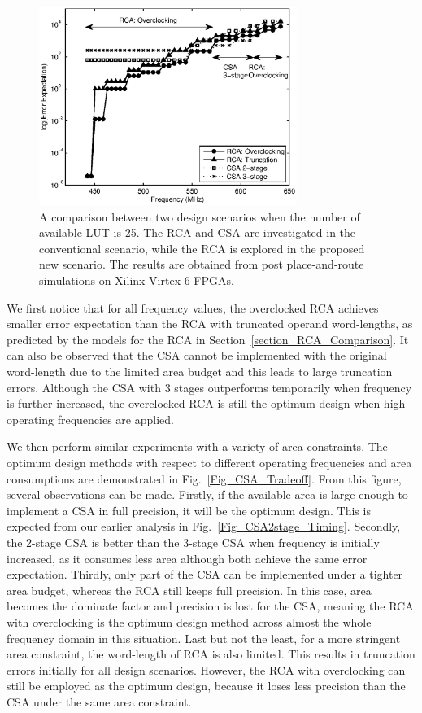 \documentclass[journal]{IEEEtran}
\begin{document}

\begin{figure}[th]
  \centering
  \includegraphics[width=3.3in]{./Figures/Error_LUT25.eps}
  \caption{A comparison between two design scenarios when the number of available LUT is 25. The RCA and CSA are investigated in the conventional scenario, while the RCA is explored in the proposed new scenario. The results are obtained from post place-and-route simulations on Xilinx Virtex-6 FPGAs.}
  \label{Fig_CSA_LUT25}
\end{figure}

We first notice that for all frequency values, the overclocked RCA achieves smaller error expectation than the RCA with truncated operand word-lengths, as predicted by the models for the RCA in Section~\ref{section_RCA_Comparison}. It can also be observed that the CSA cannot be implemented with the original word-length due to the limited area budget and this leads to large truncation errors. Although the CSA with 3 stages outperforms temporarily when frequency is further increased, the overclocked RCA is still the optimum design when high operating frequencies are applied.

We then perform similar experiments with a variety of area constraints. The optimum design methods with respect to different operating frequencies and area consumptions are demonstrated in Fig.~\ref{Fig_CSA_Tradeoff}. From this figure, several observations can be made. Firstly, if the available area is large enough to implement a CSA in full precision, it will be the optimum design. This is expected from our earlier analysis in Fig.~\ref{Fig_CSA2stage_Timing}. Secondly, the 2-stage CSA is better than the 3-stage CSA when frequency is initially increased, as it consumes less area although both achieve the same error expectation. Thirdly, only part of the CSA can be implemented under a tighter area budget, whereas the RCA still keeps full precision. In this case, area becomes the dominate factor and precision is lost for the CSA, meaning the RCA with overclocking is the optimum design method across almost the whole frequency domain in this situation. Last but not the least, for a more stringent area constraint, the word-length of RCA is also limited. This results in truncation errors initially for all design scenarios. However, the RCA with overclocking can still be employed as the optimum design, because it loses less precision than the CSA under the same area constraint.
\end{document}
